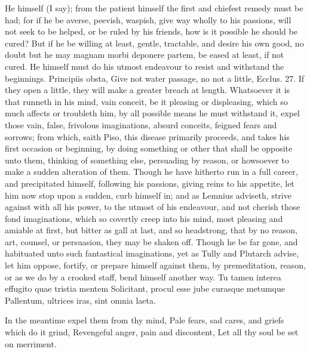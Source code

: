 {He himself (I say); from the patient himself the first and chiefest
remedy must be had; for if he be averse, peevish, waspish, give way
wholly to his passions, will not seek to be helped, or be ruled by his
friends, how is it possible he should be cured? But if he be willing at
least, gentle, tractable, and desire his own good, no doubt but he may
magnam morbi deponere partem, be eased at least, if not cured. He
himself must do his utmost endeavour to resist and withstand the
beginnings. Principiis obsta, Give not water passage, no not a little,
Ecclus.  27. If they open a little, they will make a greater breach
at length. Whatsoever it is that runneth in his mind, vain conceit, be
it pleasing or displeasing, which so much affects or troubleth him,
by all possible means he must withstand it, expel those vain,
false, frivolous imaginations, absurd conceits, feigned fears and
sorrows; from which, saith Piso, this disease primarily proceeds, and
takes his first occasion or beginning, by doing something or other that
shall be opposite unto them, thinking of something else, persuading by
reason, or howsoever to make a sudden alteration of them. Though he
have hitherto run in a full career, and precipitated himself, following
his passions, giving reins to his appetite, let him now stop upon a
sudden, curb himself in; and as Lemnius adviseth, strive against
with all his power, to the utmost of his endeavour, and not cherish
those fond imaginations, which so covertly creep into his mind, most
pleasing and amiable at first, but bitter as gall at last, and so
headstrong, that by no reason, art, counsel, or persuasion, they may be
shaken off. Though he be far gone, and habituated unto such fantastical
imaginations, yet as Tully and Plutarch advise, let him oppose,
fortify, or prepare himself against them, by premeditation, reason, or
as we do by a crooked staff, bend himself another way.
Tu tamen interea effugito quae tristia mentem
Solicitant, procul esse jube curasque metumque
Pallentum, ultrices iras, sint omnia laeta.

In the meantime expel them from thy mind,
Pale fears, sad cares, and griefs which do it grind,
Revengeful anger, pain and discontent,
Let all thy soul be set on merriment.

}

